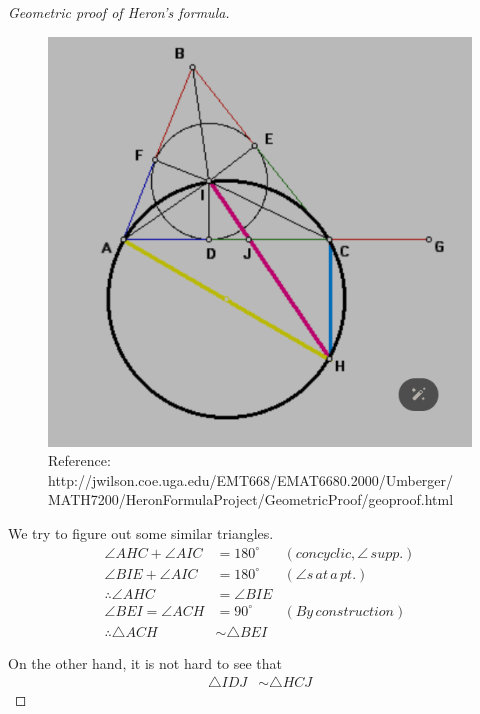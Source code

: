 \documentclass[12pt]{article}
\begin{document}
\begin{proof}[Geometric proof of Heron's formula]
        \begin{figure}[H]
            \centering
            \includegraphics[scale=0.8]{heron_circle.png}
            \caption{Reference: http://jwilson.coe.uga.edu/EMT668/EMAT6680.2000/Umberger/\\MATH7200/HeronFormulaProject/GeometricProof/geoproof.html}
        \end{figure}

        We try to figure out some similar triangles.\begin{align*}
            \angle AHC + \angle AIC &= 180^\circ &(concyclic, \angle \, supp.)\\
            \angle BIE + \angle AIC &= 180^\circ &(\angle s\, at\, a\, pt.)\\
            \therefore \angle AHC &= \angle BIE\\
            \angle BEI = \angle ACH &= 90^\circ &(By \, construction)\\
            \therefore \triangle ACH &\sim \triangle BEI
        \end{align*}

        On the other hand, it is not hard to see that \begin{align*}
            \triangle IDJ &\sim \triangle HCJ
        \end{align*}


\end{proof}
\end{document}
